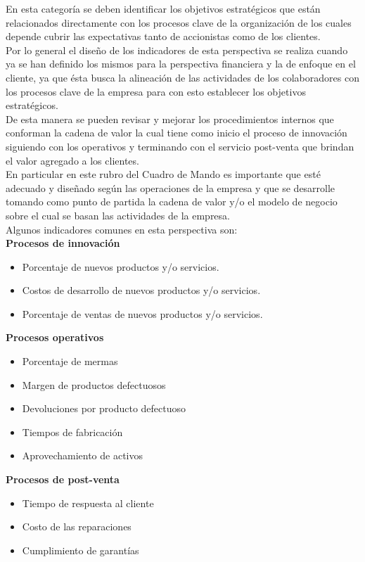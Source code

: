 En esta categoría se deben identificar los objetivos estratégicos que están relacionados directamente con los procesos clave de la organización de los cuales depende cubrir las expectativas tanto de accionistas como de los clientes. \\
Por lo general el diseño de los indicadores de esta perspectiva se realiza cuando ya se han definido los mismos para la perspectiva financiera y la de enfoque en el cliente, ya que ésta busca la alineación de las actividades de los colaboradores con los procesos clave de la empresa para con esto establecer los objetivos estratégicos. \\
De esta manera se pueden revisar y mejorar los procedimientos internos que conforman la cadena de valor la cual tiene como inicio el proceso de innovación siguiendo con los operativos y terminando con el servicio post-venta que brindan el valor agregado a los clientes.\\
En particular en este rubro del Cuadro de Mando es importante que esté adecuado y diseñado según las operaciones de la empresa y que se desarrolle tomando como punto de partida la cadena de valor y/o el modelo de negocio sobre el cual se basan las actividades de la empresa.\\

Algunos indicadores comunes en esta perspectiva son:\\

\textbf {Procesos de innovación}
\begin{itemize}
	\item Porcentaje de nuevos productos y/o servicios.
	\item Costos de desarrollo de nuevos productos y/o servicios.
	\item Porcentaje de ventas de nuevos productos y/o servicios.
\end{itemize}

\textbf {Procesos operativos}
\begin{itemize}
	\item Porcentaje de mermas
	\item Margen de productos defectuosos
	\item Devoluciones por producto defectuoso
	\item Tiempos de fabricación
	\item Aprovechamiento de activos
\end{itemize}

\textbf {Procesos de post-venta}
\begin{itemize}
	\item Tiempo de respuesta al cliente
	\item Costo de las reparaciones
	\item Cumplimiento de garantías
\end{itemize}
\pagebreak


